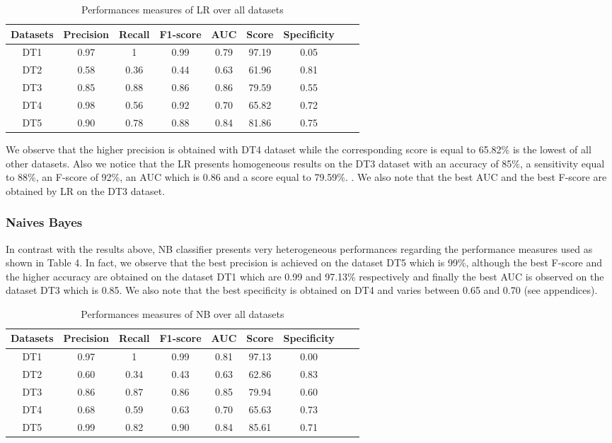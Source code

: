 \begin{table}[!ht]
\centering
\begin{tabular}{*{7}{c}l r}
  \toprule
  \textbf{Datasets} & \textbf{Precision} & \textbf{Recall} & \textbf{F1-score}&\textbf{AUC} &\textbf{Score}&\textbf{Specificity}\\
   \midrule
  DT1 &0.97 &1   &0.99 &0.79 &97.19&0.05 \\
  DT2 & 0.58 &0.36   &0.44&0.63&61.96&0.81\\
  DT3 &0.85 &0.88 &0.86&0.86&79.59&0.55\\
  DT4 &0.98 &0.56&0.92&0.70&65.82&0.72\\
  DT5 & 0.90&0.78&0.88&0.84&81.86&0.75\\
  
  
    \bottomrule
\end{tabular}
\caption{Performances measures of LR over all datasets}\label{perf-measure-dt1}
\end{table}
We observe that the higher precision is obtained with DT4 dataset while the corresponding score is equal to 65.82\% is the lowest of all other datasets. Also we notice that the LR presents homogeneous results on the DT3 dataset with an accuracy of 85\%, a sensitivity equal to 88\%, an F-score of 92\%, an AUC which is 0.86 and a score equal to 79.59\%. . We also note that the best AUC and the best F-score are obtained by LR on the DT3 dataset.
\subsubsection{Naives Bayes}
In contrast with the results above, NB classifier presents very heterogeneous performances regarding the performance measures used as shown in Table 4. In fact, we observe that the best precision is achieved on the dataset DT5 which is 99\%, although the best F-score and the higher accuracy are obtained on the dataset DT1 which are 0.99 and 97.13\% respectively and finally the best AUC is observed on the dataset DT3 which is 0.85. We also note that the best specificity is obtained on DT4 and varies between 0.65 and 0.70 (see appendices).
\begin{table}[!ht]
\centering
\begin{tabular}{*{7}{c}l r}
  \toprule
  \textbf{Datasets} & \textbf{Precision} & \textbf{Recall} & \textbf{F1-score}&\textbf{AUC} &\textbf{Score}&\textbf{Specificity}\\
   \midrule
  DT1 &0.97 &1   &0.99 &0.81 &97.13 &0.00\\
  DT2 & 0.60 &0.34   &0.43&0.63&62.86&0.83 \\
  DT3 &0.86 &0.87 &0.86&0.85&79.94&0.60\\
  DT4 &0.68 &0.59&0.63&0.70&65.63&0.73\\
  DT5 &0.99 &0.82&0.90&0.84&85.61&0.71\\
  
  
    \bottomrule
\end{tabular}
\caption{Performances measures of NB over all datasets}\label{perf-measure-dt1}
\end{table}
